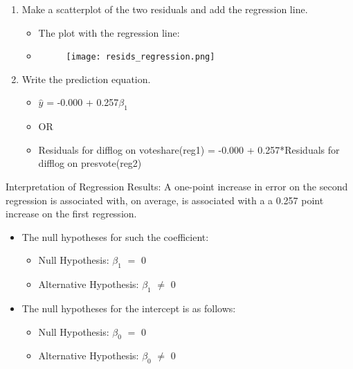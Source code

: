 \documentclass[12pt,letterpaper]{article}
\begin{document}
\begin{enumerate}
		\item Make a scatterplot of the two residuals and add the regression line. 	
		
	
\begin{itemize}
		\item The plot with the regression line:
	\item 
	\begin{figure}[h]
		\centering
		\texttt{[image: resids\_regression.png]}
	\end{figure}
\end{itemize}	
	

		\item Write the prediction equation.
		
\begin{itemize}
	\item $\hat{y}$ = -0.000 + 0.257$\beta_1$
	\item OR
	\item Residuals for difflog on voteshare(reg1) = -0.000 + 0.257*Residuals for difflog on presvote(reg2)
\end{itemize}


	\end{enumerate}
	
\begin{flushleft}Interpretation of Regression Results: A one-point increase in error on the second regression is associated with, on average, is associated with a a 0.257 point increase on the first regression.
	\end{flushleft}

\begin{itemize}
	\item  The null hypotheses for such the coefficient:
	\begin{itemize}
		\item {Null Hypothesis: $\beta_1$ $=$ 0}
		\item {Alternative Hypothesis: $\beta_1$ $\neq$ 0}
	\end{itemize}
	
	\item The null hypotheses for the intercept is as follows:
	\begin{itemize}
		\item {Null Hypothesis: $\beta_0$ $=$ 0}
		\item {Alternative Hypothesis: $\beta_0$ $\neq$ 0}
	\end{itemize}
	
\end{itemize}
\end{document}
